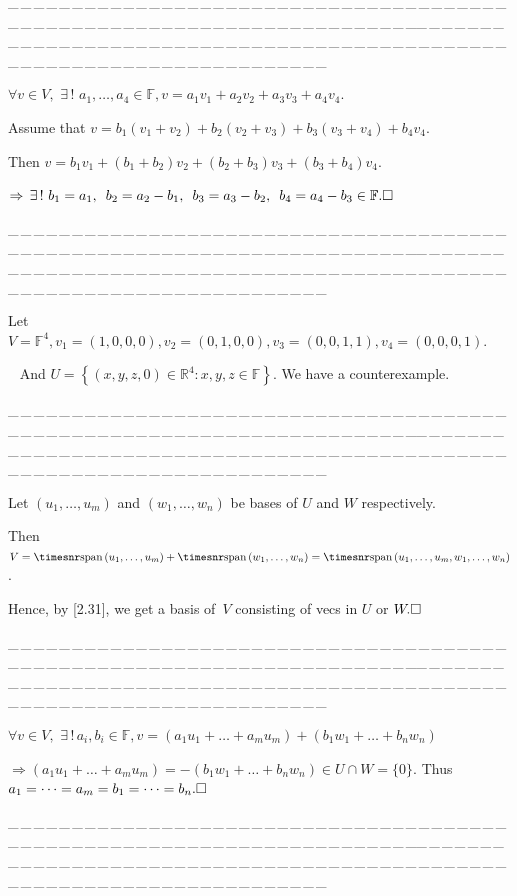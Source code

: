 \documentclass[a4paper, 11pt, UTF8]{article}
\def\Spn{{\timesnr\textup{span}}\,}
\def\Fbb{{\mathbb{F}}}
\def\Rbb{{\mathbb{R}}}
\def\ProblemEnding{{\tiny \_\,\_\,\_\,\_\,\_\,\_\,\_\,\_\,\_\,\_\,\_\,\_\,\_\,\_\,\_\,\_\,\_\,\_\,\_\,\_\,\_\,\_\,\_\,\_\,\_\,\_\,\_\,\_\,\_\,\_\,\_\,\_\,\_\,\_\,\_\,\_\,\_\,\_\,\_\,\_\,\_\,\_\,\_\,\_\,\_\,\_\,\_\,\_\,\_\,\_\,\_\,\_\,\_\,\_\,\_\,\_\,\_\,\_\,\_\,\_\,\_\,\_\,\_\,\_\,\_\,\_\,\_\,\_\,\_\,\_\,\_\_\,\_\,\_\,\_\,\_\,\_\,\_\,\_\,\_\,\_\,\_\,\_\,\_\,\_\,\_\,\_\,\_\,\_\,\_\,\_\,\_\,\_\,\_\,\_\,\_\,\_\,\_\,\_\,\_\,\_\,\_\,\_\,\_\,\_\,\_\,\_\,\_\,\_\,\_\,\_\,\_\,\_\,\_\,\_\,\_\,\_\,\_\,\_\,\_\,\_\,\_\,\_\,\_\,\_\,\_\,\_\,\_\,\_\,\_\,\_\,\_\,\_\,\_\,\_\,\_\,\_\,\_\,\_\,\_\,\_\,\_}}
\begin{document}
\begin{large}
\par
\ProblemEnding\par

$\forall v\in V,\,\,\exists\,!\,\,a_1,\dots,a_4\in\Fbb,v=a_1 v_1+a_2 v_2+a_3 v_3+a_4 v_4.$\par\quad
Assume that $v=b_1(v_1+v_2)+b_2(v_2+v_3)+b_3(v_3+v_4)+b_4 v_4$.\par\quad
Then $v=b_1 v_1+(b_1+b_2)v_2+(b_2+b_3)v_3+(b_3+b_4)v_4$.\par\quad
$\Rightarrow\,\exists\,!\,\,b_1=a_1,\,\,\,b_2=a_2-b_1,\,\,\,b_3=a_3-b_2,\,\,\,b_4=a_4-b_3\in\Fbb.\hfill\square$
\par
\ProblemEnding\par

Let $V=\Fbb^4,v_1=(1,0,0,0),v_2=(0,1,0,0),v_3=(0,0,1,1),v_4=(0,0,0,1).$\par\qquad\quad\quad\,\,\,
And $U=\left\{(x,y,z,0)\in\Rbb^4:x,y,z\in\Fbb\right\}$. We have a counterexample.\par
\ProblemEnding\par

Let $(u_1,\dots,u_m)$ and $(w_1,\dots,w_n)$ be bases of $U$ and $W$ respectively.\par\quad
Then $V=\Spn(u_1,\dots,u_m)+\Spn(w_1,\dots,w_n)=\Spn(u_1,\dots,u_m,w_1,\dots,w_n)$.\par\quad
Hence, by [2.31], we get a basis of \,$V$ consisting of vecs in $U$ or $W.\hfill\square$\par
\ProblemEnding\par

$\forall v\in V,\,\,\exists\,!\,a_i,b_i\in\Fbb,v=(a_1 u_1+\dots+a_m u_m)+(b_1 w_1+\dots+b_n w_n)$\par\quad
$\Rightarrow (a_1 u_1+\dots+a_m u_m)=-(b_1 w_1+\dots+b_n w_n)\in U\cap W=\{0\}$. Thus $a_1=\dots=a_m=b_1=\dots=b_n.\hfill\square$\par
\ProblemEnding\par


\end{large}
\end{document}
